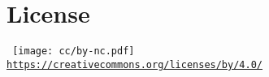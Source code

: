 
\thispagestyle{empty} %
\flushbottom %
\maketitle %



\section*{License}

    \scriptsize\noindent%
    \begin{minipage}{\columnwidth}
        \centering\tt
        \texttt{[image: cc/by-nc.pdf]}\\[0.5\smallskipamount]
        {\scriptsize\url{https://creativecommons.org/licenses/by/4.0/}}
    \end{minipage}
    \normalsize



\tableofcontents



